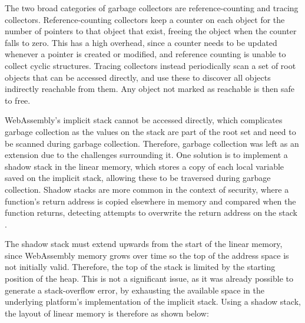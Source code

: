 The two broad categories of garbage collectors are reference-counting and tracing collectors. Reference-counting collectors keep a counter on each object for the number of pointers to that object that exist, freeing the object when the counter falls to zero. This has a high overhead, since a counter needs to be updated whenever a pointer is created or modified, and reference counting is unable to collect cyclic structures. Tracing collectors instead periodically scan a set of root objects that can be accessed directly, and use these to discover all objects indirectly reachable from them. Any object not marked as reachable is then safe to free. 

WebAssembly's implicit stack cannot be accessed directly, which complicates garbage collection as the values on the stack are part of the root set and need to be scanned during garbage collection. Therefore, garbage collection was left as an extension due to the challenges surrounding it. One solution is to implement a shadow stack in the linear memory, which stores a copy of each local variable saved on the implicit stack, allowing these to be traversed during garbage collection. Shadow stacks are more common in the context of security, where a function's return address is copied elsewhere in memory and compared when the function returns, detecting attempts to overwrite the return address on the stack \cite{shadow-stack}. %

The shadow stack must extend upwards from the start of the linear memory, since WebAssembly memory grows over time so the top of the address space is not initially valid. Therefore, the top of the stack is limited by the starting position of the heap. This is not a significant issue, as it was already possible to generate a stack-overflow error, by exhausting the available space in the underlying platform's implementation of the implicit stack. Using a shadow stack, the layout of linear memory is therefore as shown below:




